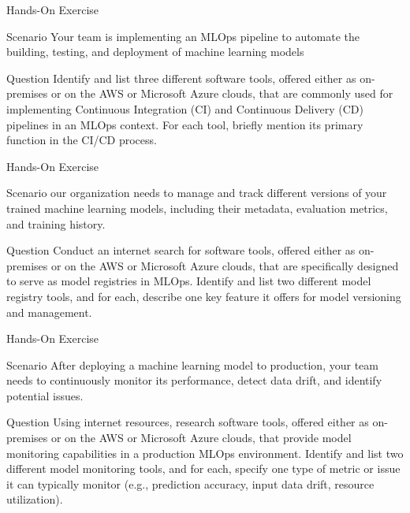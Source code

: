 \documentclass[ignorenonframetext,xcolor=x11names]{beamer}
\begin{document}
\begin{frame}{Hands-On Exercise}

\begin{block}{Scenario}
Your team is implementing an MLOps pipeline to automate the building, testing, and deployment of machine learning models
\end{block}

\begin{block}{Question}
Identify and list three different software tools, offered either as on-premises or on the AWS or Microsoft Azure clouds, that are commonly used for implementing Continuous Integration (CI) and Continuous Delivery (CD) pipelines in an MLOps context. For each tool, briefly mention its primary function in the CI/CD process.
\end{block}
\end{frame}


\begin{frame}{Hands-On Exercise}

\begin{block}{Scenario}
our organization needs to manage and track different versions of your trained machine learning models, including their metadata, evaluation metrics, and training history.
\end{block}

\begin{block}{Question}
Conduct an internet search for software tools, offered either as on-premises or on the AWS or Microsoft Azure clouds, that are specifically designed to serve as model registries in MLOps. Identify and list two different model registry tools, and for each, describe one key feature it offers for model versioning and management.
\end{block}
\end{frame}

\begin{frame}{Hands-On Exercise}

\begin{block}{Scenario}
After deploying a machine learning model to production, your team needs to continuously monitor its performance, detect data drift, and identify potential issues.
\end{block}

\begin{block}{Question}
Using internet resources, research software tools, offered either as on-premises or on the AWS or Microsoft Azure clouds, that provide model monitoring capabilities in a production MLOps environment. Identify and list two different model monitoring tools, and for each, specify one type of metric or issue it can typically monitor (e.g., prediction accuracy, input data drift, resource utilization).
\end{block}
\end{frame}
\end{document}
